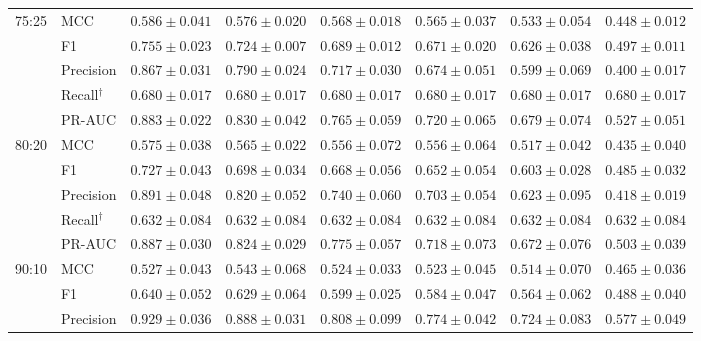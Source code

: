\begin{table}[tbp]
{\begin{tabular}{llcccccc}
\cmidrule{2-8}
\multirow{5}{*}{75:25} & MCC & \cellcolor{black!10}$0.586 \pm 0.041$ & $0.576 \pm 0.020$ & $0.568 \pm 0.018$ & $0.565 \pm 0.037$ & $0.533 \pm 0.054$ & \cellcolor{black!10}$0.448 \pm 0.012$ \\
 & F1 & $0.755 \pm 0.023$ & $0.724 \pm 0.007$ & $0.689 \pm 0.012$ & $0.671 \pm 0.020$ & $0.626 \pm 0.038$ & $0.497 \pm 0.011$ \\
 & Precision & \cellcolor{black!10}$0.867 \pm 0.031$ & $0.790 \pm 0.024$ & $0.717 \pm 0.030$ & $0.674 \pm 0.051$ & $0.599 \pm 0.069$ & \cellcolor{black!10}$0.400 \pm 0.017$ \\
 & Recall$^{\dagger}$ & $0.680 \pm 0.017$ & $0.680 \pm 0.017$ & $0.680 \pm 0.017$ & $0.680 \pm 0.017$ & $0.680 \pm 0.017$ & $0.680 \pm 0.017$ \\
 & PR-AUC & \cellcolor{black!10}$0.883 \pm 0.022$ & $0.830 \pm 0.042$ & $0.765 \pm 0.059$ & $0.720 \pm 0.065$ & $0.679 \pm 0.074$ & \cellcolor{black!10}$0.527 \pm 0.051$ \\
\cmidrule{2-8}
\multirow{5}{*}{80:20} & MCC & $0.575 \pm 0.038$ & $0.565 \pm 0.022$ & $0.556 \pm 0.072$ & $0.556 \pm 0.064$ & $0.517 \pm 0.042$ & $0.435 \pm 0.040$ \\
 & F1 & $0.727 \pm 0.043$ & $0.698 \pm 0.034$ & $0.668 \pm 0.056$ & $0.652 \pm 0.054$ & $0.603 \pm 0.028$ & $0.485 \pm 0.032$ \\
 & Precision & $0.891 \pm 0.048$ & $0.820 \pm 0.052$ & $0.740 \pm 0.060$ & $0.703 \pm 0.054$ & $0.623 \pm 0.095$ & $0.418 \pm 0.019$ \\
 & Recall$^{\dagger}$ & $0.632 \pm 0.084$ & $0.632 \pm 0.084$ & $0.632 \pm 0.084$ & $0.632 \pm 0.084$ & $0.632 \pm 0.084$ & $0.632 \pm 0.084$ \\
 & PR-AUC & $0.887 \pm 0.030$ & $0.824 \pm 0.029$ & $0.775 \pm 0.057$ & $0.718 \pm 0.073$ & $0.672 \pm 0.076$ & $0.503 \pm 0.039$ \\
\cmidrule{2-8}
\multirow{5}{*}{90:10} & MCC & \cellcolor{black!10}$\mathbf{0.527 \pm 0.043}$ & $0.543 \pm 0.068$ & $0.524 \pm 0.033$ & $0.523 \pm 0.045$ & $0.514 \pm 0.070$ & \cellcolor{black!10}$\mathbf{0.465 \pm 0.036}$ \\
 & F1 & \cellcolor{black!10}$\mathbf{0.640 \pm 0.052}$ & $0.629 \pm 0.064$ & $0.599 \pm 0.025$ & $0.584 \pm 0.047$ & $0.564 \pm 0.062$ & \cellcolor{black!10}$\mathbf{0.488 \pm 0.040}$ \\
 & Precision & \cellcolor{black!10}$0.929 \pm 0.036$ & $0.888 \pm 0.031$ & $0.808 \pm 0.099$ & $0.774 \pm 0.042$ & $0.724 \pm 0.083$ & \cellcolor{black!10}$0.577 \pm 0.049$ \\

\end{tabular}}
\end{table}
